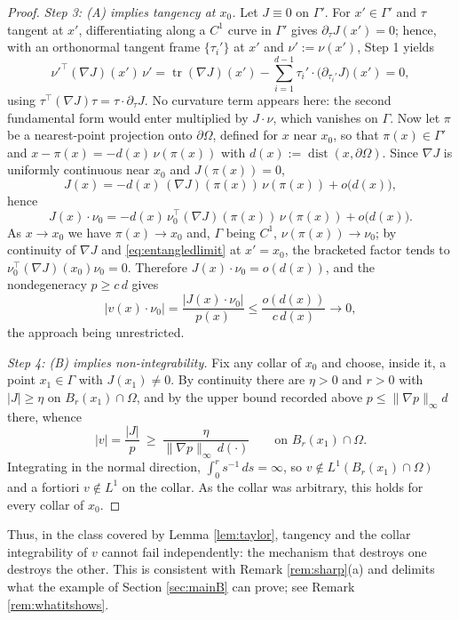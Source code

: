 \documentclass[11pt]{amsart}
\theoremstyle{definition}
\newcommand{\dd}{\,d}
\begin{document}
\begin{proof}
\emph{Step 3: \textup{(A)} implies tangency at $x_0$.} Let $J\equiv0$
on $\Gamma'$. For $x'\in\Gamma'$ and $\tau$ tangent at $x'$,
differentiating along a $C^1$ curve in $\Gamma'$ gives
$\partial_\tau J(x')=0$; hence, with an orthonormal tangent frame
$\{\tau_i'\}$ at $x'$ and $\nu':=\nu(x')$, Step 1 yields
\begin{equation}\label{eq:entangledlimit}
\nu'^{\top}(\nabla J)(x')\,\nu'
=\operatorname{tr}(\nabla J)(x')-\sum_{i=1}^{d-1}
\tau_i'\cdot\big(\partial_{\tau_i'}J\big)(x')=0 ,
\end{equation}
using $\tau^{\top}(\nabla J)\tau=\tau\cdot\partial_\tau J$. No
curvature term appears here: the second fundamental form would enter
multiplied by $J\cdot\nu$, which vanishes on $\Gamma$. Now let $\pi$
be a nearest-point projection onto $\partial\Omega$, defined for $x$
near $x_0$, so that $\pi(x)\in\Gamma'$ and
$x-\pi(x)=-d(x)\,\nu(\pi(x))$ with
$d(x):=\operatorname{dist}(x,\partial\Omega)$. Since $\nabla J$ is
uniformly continuous near $x_0$ and $J(\pi(x))=0$,
\[
J(x)=-d(x)\,(\nabla J)(\pi(x))\,\nu(\pi(x))+o\big(d(x)\big),
\]
hence
\[
J(x)\cdot\nu_0=-d(x)\,\nu_0^{\top}(\nabla J)(\pi(x))\,\nu(\pi(x))
+o\big(d(x)\big).
\]
As $x\to x_0$ we have $\pi(x)\to x_0$ and, $\Gamma$ being $C^1$,
$\nu(\pi(x))\to\nu_0$; by continuity of $\nabla J$ and
\eqref{eq:entangledlimit} at $x'=x_0$, the bracketed factor tends to
$\nu_0^{\top}(\nabla J)(x_0)\nu_0=0$. Therefore $J(x)\cdot\nu_0
=o(d(x))$, and the nondegeneracy $p\ge c\,d$ gives
\[
\big|v(x)\cdot\nu_0\big|=\frac{|J(x)\cdot\nu_0|}{p(x)}
\le\frac{o(d(x))}{c\,d(x)}\longrightarrow0 ,
\]
the approach being unrestricted.

\emph{Step 4: \textup{(B)} implies non-integrability.} Fix any collar
of $x_0$ and choose, inside it, a point $x_1\in\Gamma$ with
$J(x_1)\neq0$. By continuity there are $\eta>0$ and $r>0$ with
$|J|\ge\eta$ on $B_r(x_1)\cap\Omega$, and by the upper bound
recorded above $p\le\|\nabla p\|_\infty d$ there, whence
\[
|v|=\frac{|J|}{p}\ \ge\ \frac{\eta}{\|\nabla p\|_\infty\,d(\cdot)}
\qquad\text{on }B_r(x_1)\cap\Omega .
\]
Integrating in the normal direction, $\int_0^r s^{-1}\dd s=\infty$,
so $v\notin L^1(B_r(x_1)\cap\Omega)$ and a fortiori $v\notin L^1$ on
the collar. As the collar was arbitrary, this holds for every collar
of $x_0$.

\end{proof}

Thus, in the class covered by Lemma \ref{lem:taylor}, tangency and
the collar integrability of $v$ cannot fail independently: the
mechanism that destroys one destroys the other. This is consistent
with Remark \ref{rem:sharp}(a) and delimits what the example of
Section \ref{sec:mainB} can prove; see Remark
\ref{rem:whatitshows}.
\end{document}
